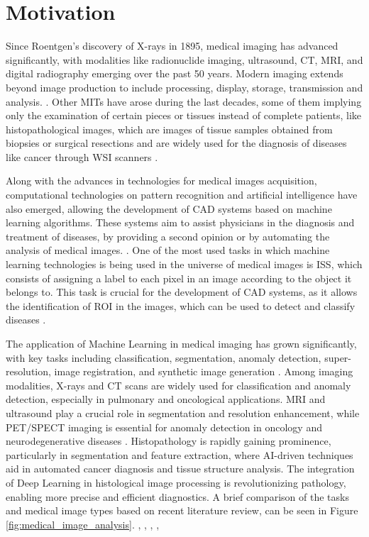 \section{Motivation}\label{sec:motivation}

Since Roentgen’s discovery of X-rays in 1895, medical imaging has
advanced significantly, with modalities like radionuclide imaging,
ultrasound, \gls{CT}, \gls{MRI}, and digital radiography emerging over the past
50 years. Modern imaging extends beyond image production to include
processing, display, storage, transmission and analysis.
\cite{Zhou2021}.
Other \gls{MITs} have arose during the last decades, some of them
implying only the examination of certain pieces or tissues
instead of complete patients, like histopathological images, which
are images of tissue samples obtained from biopsies or surgical
resections and are widely used for the diagnosis of diseases like
cancer through \gls{WSI} scanners \cite{Rashmi2021}.

Along with the advances in technologies for medical images acquisition,
computational technologies on pattern recognition and artificial intelligence
have also emerged, allowing the development of \gls{CAD} systems based on
machine learning algorithms. These systems aim to assist physicians
in the diagnosis and treatment of diseases, by providing a second
opinion or by automating the analysis of medical images.
\cite{Panayides2020}. One of the most used tasks in which machine
learning technologies is being used in the universe of medical images
is \gls{ISS}, which consists of assigning a label to each pixel in an image
according to the object it belongs to. This task is crucial for the development
of \gls{CAD} systems, as it allows the identification of \gls{ROI} in
the images, which can be used to detect and classify diseases
\cite{Azad2024}.

The application of Machine Learning in medical imaging has grown
significantly, with key tasks including classification, segmentation,
anomaly detection, super-resolution, image registration, and
synthetic image generation \cite{BritoPacheco2025}. Among imaging
modalities, X-rays and \gls{CT} scans are widely used for classification
and anomaly detection, especially in pulmonary and oncological
applications. \gls{MRI} and ultrasound play a crucial role in segmentation
and resolution enhancement, while PET/SPECT imaging is essential for
anomaly detection in oncology and neurodegenerative diseases
\cite{BritoPacheco2025}.
Histopathology is rapidly gaining prominence, particularly in segmentation and
feature extraction, where AI-driven techniques aid in automated
cancer diagnosis and tissue structure analysis. The integration of
Deep Learning in histological image processing is revolutionizing
pathology, enabling more precise and efficient diagnostics. A brief
comparison of the tasks and medical image types
based on recent literature review, can be seen in Figure
\ref{fig:medical_image_analysis}. \cite{YuEtAl2025},
\cite{BritoPacheco2025}, \cite{RyouEtAl2025},
\cite{DingyiEtAl2025}, \cite{BehnazEtAl2025}

